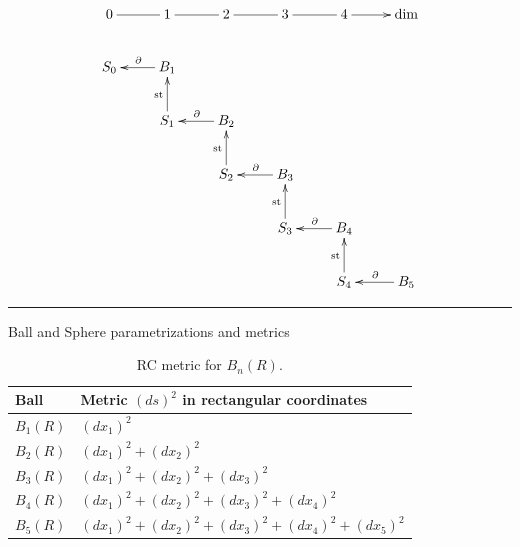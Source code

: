 \begin{table}[h!]
$$
\xymatrix{
0\ar@{-}[r]
&1\ar@{-}[r]
&2\ar@{-}[r]
&3\ar@{-}[r]
&4\ar[r]
&\text{dim}
\\
S_0
&B_1\ar[l]_{ \partial}
\\
&S_1\ar[u]^{\text{st}}
&B_2\ar[l]_{ \partial}
\\
&&S_2\ar[u]^{\text{st}}
&B_3\ar[l]_{ \partial}
\\
&&&S_3\ar[u]^{\text{st}}
&B_4\ar[l]_{ \partial}
\\
&&&&S_4 \ar[u]^{\text{st}}
&B_5\ar[l]_{ \partial}
}
$$
\caption{Staircase relationship between all the $n$-dim spheres $S_n$ and
all the $n$-dim open balls $B_{n}$.
Here \qt{$\partial$} means 
and  stands 
for a stereographic projection.
For example,  $S_1=\partial B_2$,
and $st(S_2/{+1, -1})=B_2$,
where $S_2/\{+1, -1\}$ stands for  (the Southern Hemisphere) of $S_2$. Note that $\partial$ when applied to a set, lowers its dimension by one,
whereas $st(\;)$ does not change the dimension of a set.}
\label{tab-SB-staircase}
\end{table}
\hrule 
Ball and Sphere parametrizations
and metrics

\begin{table}[h!]
\centering
\begin{tabular}{|l|l|}
\hline
\rowcolor[HTML]{FFFC9E} 
Ball & Metric $(ds)^2$ in rectangular coordinates \\ \hline
\rowcolor[HTML]{FFFFFF} 
$B_1(R)$ & $(dx_1)^2$ \\ \hline
\rowcolor[HTML]{FFFFFF} 
$B_2(R)$ & \cellcolor[HTML]{FFFFFF}$(dx_1)^2 + (dx_2)^2$ \\ \hline
$B_3(R)$ & \cellcolor[HTML]{FFFFFF}$(dx_1)^2 + (dx_2)^2 + (dx_3)^2$ \\ \hline
$B_4(R)$ & \cellcolor[HTML]{FFFFFF}$(dx_1)^2 + (dx_2)^2 + (dx_3)^2 + (dx_4)^2$ \\ \hline
$B_5(R)$ & $(dx_1)^2 + (dx_2)^2 + (dx_3)^2 + (dx_4)^2 + (dx_5)^2$ \\ \hline
\end{tabular}
\caption{RC metric for $B_n(R)$. }
\label{tab-ball-rect-coords}
\end{table}

